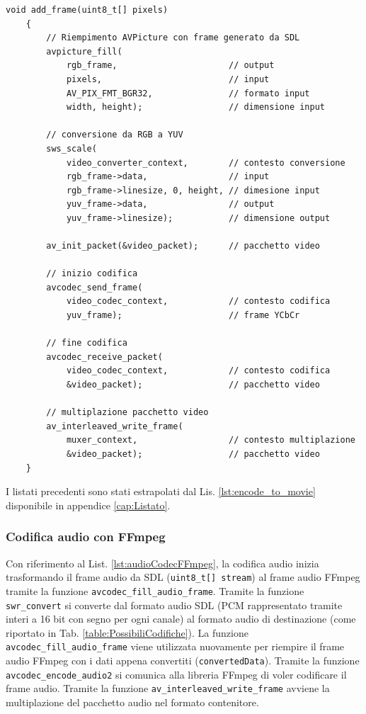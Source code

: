 \begin{lstlisting}[caption=Codice per la codifica video, label={lst:videoCodecFFmpeg}]
	void add_frame(uint8_t[] pixels)
	{
		// Riempimento AVPicture con frame generato da SDL
		avpicture_fill(
			rgb_frame, 						// output
			pixels, 						// input
			AV_PIX_FMT_BGR32,				// formato input
			width, height); 				// dimensione input

		// conversione da RGB a YUV
		sws_scale(
			video_converter_context,		// contesto conversione
			rgb_frame->data,				// input
			rgb_frame->linesize, 0, height,	// dimesione input
			yuv_frame->data, 				// output
			yuv_frame->linesize); 			// dimensione output
		
		av_init_packet(&video_packet);		// pacchetto video

		// inizio codifica
		avcodec_send_frame(
			video_codec_context,			// contesto codifica
			yuv_frame);						// frame YCbCr

		// fine codifica
		avcodec_receive_packet(
			video_codec_context,			// contesto codifica
			&video_packet);					// pacchetto video

		// multiplazione pacchetto video
		av_interleaved_write_frame(
			muxer_context,					// contesto multiplazione
			&video_packet);					// pacchetto video
	}
\end{lstlisting}

I listati precedenti sono stati estrapolati dal Lis. \ref{lst:encode_to_movie} disponibile in appendice \ref{cap:Listato}.



\subsubsection{Codifica audio con FFmpeg}
Con riferimento al List. \ref{lst:audioCodecFFmpeg}, la codifica audio inizia trasformando il frame audio da SDL (\verb|uint8_t[] stream|) al frame audio FFmpeg tramite la funzione \verb|avcodec_fill_audio_frame|. Tramite la funzione \verb|swr_convert| si converte dal formato audio SDL (PCM rappresentato tramite interi a 16 bit con segno per ogni canale) al formato audio di destinazione (come riportato in Tab. \ref{table:PossibiliCodifiche}). La funzione \verb|avcodec_fill_audio_frame| viene utilizzata nuovamente per riempire il frame audio FFmpeg con i dati appena convertiti (\verb|convertedData|). Tramite la funzione \verb|avcodec_encode_audio2| si comunica alla libreria FFmpeg di voler codificare il frame audio. Tramite la funzione \verb|av_interleaved_write_frame| avviene la multiplazione del pacchetto audio nel formato contenitore.

